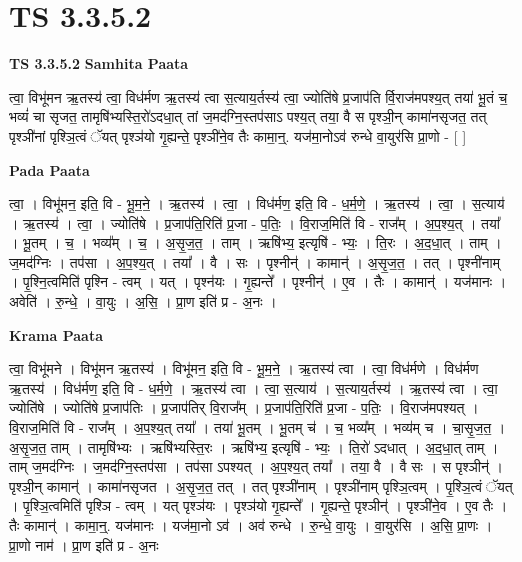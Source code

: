 \documentclass[17pt]{extarticle}
\begin{document}
\section{ TS 3.3.5.2 }

\textbf{TS 3.3.5.2 } \newline
\textbf{Samhita Paata} \newline

त्वा॒ विभू॑मन ऋ॒तस्य॑ त्वा॒ विध॑र्मण ऋ॒तस्य॑ त्वा स॒त्याय॒र्तस्य॑ त्वा॒ ज्योति॑षे प्र॒जाप॑ति र्वि॒राज॑मपश्य॒त् तया॑ भू॒तं च॒ भव्यं॑ चा सृजत॒ तामृषि॑भ्यस्ति॒रो॑ऽदधा॒त् तां ज॒मद॑ग्नि॒स्तप॑साऽ पश्य॒त् तया॒ वै स पृश्ञी॒न् कामा॑नसृजत॒ तत् पृश्ञी॑नां पृश्ञि॒त्वं ॅयत् पृश्ञ॑यो गृ॒ह्यन्ते॒ पृश्ञी॑ने॒व तैः कामा॒न्॒. यज॑मा॒नोऽव॑ रुन्धे वा॒युर॑सि प्रा॒णो - [  ] \newline

\textbf{Pada Paata} \newline

त्वा॒ । विभू॑मन॒ इति॒ वि - भू॒म॒ने॒ । ऋ॒तस्य॑ । त्वा॒ । विध॑र्मण॒ इति॒ वि - ध॒र्म॒णे॒ । ऋ॒तस्य॑ । त्वा॒ । स॒त्याय॑ । ऋ॒तस्य॑ । त्वा॒ । ज्योति॑षे । प्र॒जाप॑ति॒रिति॑ प्र॒जा - प॒तिः॒ । वि॒राज॒मिति॑ वि - राज᳚म् । अ॒प॒श्य॒त् । तया᳚ । भू॒तम् । च॒ । भव्य᳚म् । च॒ । अ॒सृ॒ज॒त॒ । ताम् । ऋषि॑भ्य॒ इत्यृषि॑ - भ्यः॒ । ति॒रः । अ॒द॒धा॒त् । ताम् । ज॒मद॑ग्निः । तप॑सा । अ॒प॒श्य॒त् । तया᳚ । वै । सः । पृश्नीन्॑ । कामान्॑ । अ॒सृ॒ज॒त॒ । तत् । पृश्नी॑नाम् । पृ॒श्नि॒त्वमिति॑ पृश्नि - त्वम् । यत् । पृश्न॑यः । गृ॒ह्यन्ते᳚ । पृश्नीन्॑ । ए॒व । तैः । कामान्॑ । यज॑मानः । अवेति॑ । रु॒न्धे॒ । वा॒युः । अ॒सि॒ । प्रा॒ण इति॑ प्र - अ॒नः ।  \newline


\textbf{Krama Paata} \newline

त्वा॒ विभू॑मने । विभू॑मन ऋ॒तस्य॑ । विभू॑मन॒ इति॒ वि - भू॒म॒ने॒ । ऋ॒तस्य॑ त्वा । त्वा॒ विध॑र्मणे । विध॑र्मण ऋ॒तस्य॑ । विध॑र्मण॒ इति॒ वि - ध॒र्म॒णे॒ । ऋ॒तस्य॑ त्वा । त्वा॒ स॒त्याय॑ । स॒त्याय॒र्तस्य॑ । ऋ॒तस्य॑ त्वा । त्वा॒ ज्योति॑षे । ज्योति॑षे प्र॒जाप॑तिः । प्र॒जाप॑तिर् वि॒राज᳚म् । प्र॒जाप॑ति॒रिति॑ प्र॒जा - प॒तिः॒ । वि॒राज॑मपश्यत् । वि॒राज॒मिति॑ वि - राज᳚म् । अ॒प॒श्य॒त् तया᳚ । तया॑ भू॒तम् । भू॒तम् च॑ । च॒ भव्य᳚म् । भव्य॑म् च । चा॒सृ॒ज॒त॒ । अ॒सृ॒ज॒त॒ ताम् । तामृषि॑भ्यः । ऋषि॑भ्यस्ति॒रः । ऋषि॑भ्य॒ इत्यृषि॑ - भ्यः॒ । ति॒रो॑ ऽदधात् । अ॒द॒धा॒त् ताम् । ताम् ज॒मद॑ग्निः । ज॒मद॑ग्नि॒स्तप॑सा । तप॑सा ऽपश्यत् । अ॒प॒श्य॒त् तया᳚ । तया॒ वै । वै सः । स पृश्ञीन्॑ । पृश्ञी॒न् कामान्॑ । कामा॑नसृजत । अ॒सृ॒ज॒त॒ तत् । तत् पृश्ञी॑नाम् । पृश्ञी॑नाम् पृश्ञि॒त्वम् । पृ॒श्ञि॒त्वं ॅयत् । पृ॒श्ञि॒त्वमिति॑ पृश्ञि - त्वम् । यत् पृश्ञ॑यः । पृश्ञ॑यो गृ॒ह्यन्ते᳚ । गृ॒ह्यन्ते॒ पृश्ञीन्॑ । पृश्ञी॑ने॒व । ए॒व तैः । तैः कामान्॑ । कामा॒न्॒. यज॑मानः । यज॑मा॒नो ऽव॑ । अव॑ रुन्धे । रु॒न्धे॒ वा॒युः । वा॒युर॑सि । अ॒सि॒ प्रा॒णः । प्रा॒णो नाम॑ । प्रा॒ण इति॑ प्र - अ॒नः \newline
\end{document}
